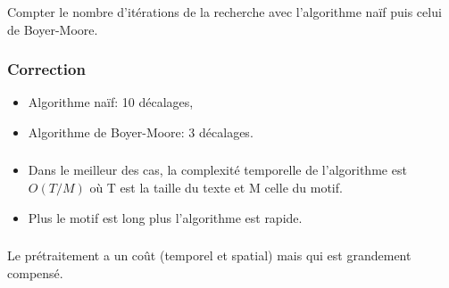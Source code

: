 \documentclass[svgnames,11pt]{beamer}
\begin{document}
\begin{frame}
    \frametitle{}
    \begin{activite}
        Compter le nombre d'itérations de la recherche avec l'algorithme naïf puis celui de Boyer-Moore.
        \end{activite}
    

\end{frame}
\begin{frame}
    \frametitle{Correction}

    \begin{itemize}
        \item Algorithme naïf: 10 décalages,
        \item Algorithme de Boyer-Moore: 3 décalages.
    \end{itemize}

\end{frame}
\begin{frame}
    \frametitle{}

    \begin{aretenir}[Remarques]
        \begin{itemize}
            \item Dans le meilleur des cas, la complexité temporelle de l'algorithme est $O(T/M)$ où T est la taille du texte et M celle du motif.
            \item Plus le motif est long plus l'algorithme est rapide.
        \end{itemize}
        \end{aretenir}

\end{frame}
\begin{frame}
    \frametitle{}

    Le prétraitement a un coût (temporel et spatial) mais qui est grandement compensé.

\end{frame}
\end{document}
